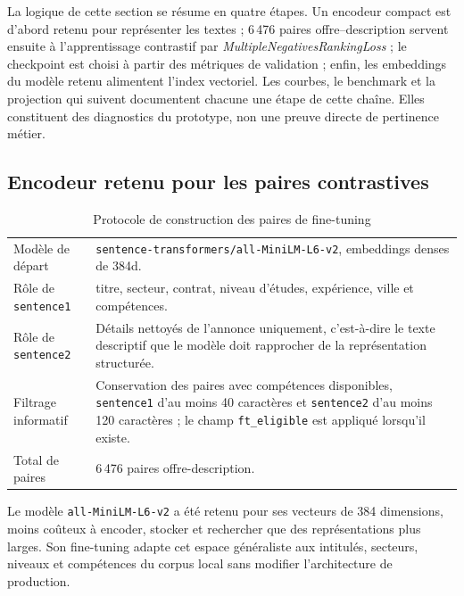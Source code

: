 La logique de cette section se résume en quatre étapes. Un encodeur compact est d'abord retenu pour représenter les textes ; 6\,476 paires offre--description servent ensuite à l'apprentissage contrastif par \textit{MultipleNegativesRankingLoss} ; le checkpoint est choisi à partir des métriques de validation ; enfin, les embeddings du modèle retenu alimentent l'index vectoriel. Les courbes, le benchmark et la projection qui suivent documentent chacune une étape de cette chaîne. Elles constituent des diagnostics du prototype, non une preuve directe de pertinence métier.
\subsection{Encodeur retenu pour les paires contrastives}
\begin{table}[H]
	\centering
	\caption{Protocole de construction des paires de fine-tuning}
	\label{tab:implementation_protocole_finetuning}
	\tableStyleStart
	\begin{tabularx}{\textwidth}{p{3.5cm}X}
		\rowcolor{darkblue}
		\tabheader{Élément} & \tabheader{Implémentation observée} \\
		\midrule
		Modèle de départ & \texttt{sentence-transformers/all-MiniLM-L6-v2}, embeddings denses de 384d. \\
		Rôle de \texttt{sentence1} & titre, secteur, contrat, niveau d'études, expérience, ville et compétences. \\
		Rôle de \texttt{sentence2} & Détails nettoyés de l'annonce uniquement, c'est-à-dire le texte descriptif que le modèle doit rapprocher de la représentation structurée. \\
		Filtrage informatif & Conservation des paires avec compétences disponibles, \texttt{sentence1} d'au moins 40 caractères et \texttt{sentence2} d'au moins 120 caractères ; le champ \texttt{ft\_eligible} est appliqué lorsqu'il existe. \\
		Total de paires & 6\,476 paires offre-description. \\
		\bottomrule
	\end{tabularx}
	\tableStyleEnd
\end{table}
Le modèle \texttt{all-MiniLM-L6-v2} a été retenu pour ses vecteurs de 384 dimensions, moins coûteux à encoder, stocker et rechercher que des représentations plus larges. 
Son fine-tuning adapte cet espace généraliste aux intitulés, secteurs, niveaux et compétences du corpus local sans modifier l'architecture de production.


